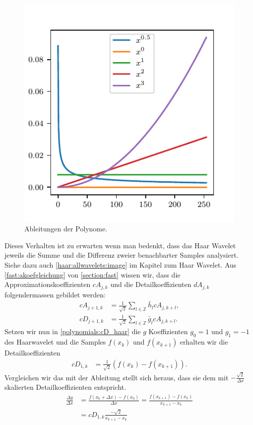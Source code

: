 \begin{refsection}
\begin{figure}
    \centering
    \includegraphics{papers/polynomials/images/polynomials_signals_diff.pdf}
    \caption{Ableitungen der Polynome.\label{polynomials:diff}}
\end{figure}

Dieses Verhalten ist zu erwarten wenn man bedenkt, dass das Haar Wavelet
jeweils die Summe und die Differenz zweier benachbarter Samples analysiert.
Siehe dazu auch \cref{haar:allwavelets:image} im Kapitel zum Haar Wavelet. Aus
\cref{fast:akoefgleichung} von \cref{section:fast} wissen wir, dass die
Approximationskoeffizienten $cA_{j,k}$ und die Detailkoeffizienten $dA_{j,k}$
folgendermassen gebildet werden:
\begin{align}
cA_{j+1,k}
&=
\frac{1}{\sqrt{2}} \sum_{l\in\mathbb Z} \bar{h}_l cA_{j,k+l}, \nonumber
\\
cD_{j+1,k}
&=
\frac{1}{\sqrt{2}} \sum_{l\in\mathbb Z} \bar{g}_l cA_{j,k+l}.
\label{polynomials:cD_haar}
\end{align}
Setzen wir nun in \cref{polynomials:cD_haar} die $g$ Koeffizienten $g_0=1$ und
$g_1=-1$ des Haarwavelet und die Samples $f(x_k)$ und $f(x_{k + 1})$ erhalten
wir die Detailkoeffizienten
\begin{align}
    cD_{1,k} & = \frac{1}{\sqrt{2}}\left(f(x_k) - f(x_{k + 1})\right).
\end{align}
Vergleichen wir das mit der Ableitung stellt sich heraus, dass sie dem mit
$-\frac{\sqrt{2}}{\Delta x}$ skalierten Detailkoeffizienten entspricht.
\begin{align}
\frac{\Delta y}{\Delta x} &= \frac{f(x_0+\Delta x) - f(x_0)}{\Delta x}
                           = \frac{f(x_{k+1}) - f(x_k)}{x_{k+1} - x_k} \nonumber \\
                          &= cD_{1,k} \frac{-\sqrt{2}}{x_{k+1} - x_k}
                          \label{polynomials:eq:cD_haar_ableitung}
\end{align}


\end{refsection}

